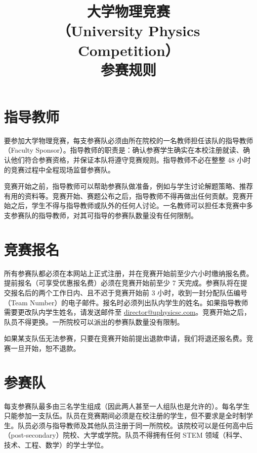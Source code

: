 \documentclass[11pt,a4paper]{ctexart}
\title{\bfseries 大学物理竞赛\\[0.3em]（University Physics Competition）\\[0.3em]参赛规则}
\author{}
\date{}
\begin{document}
\maketitle

\vspace{-2em}


\vspace{1em}

\section{指导教师}

要参加大学物理竞赛，每支参赛队必须由所在院校的一名教师担任该队的指导教师（Faculty
Sponsor）。指导教师的职责是：确认参赛学生确实在本校注册就读、确认他们符合参赛资格，并保证本队将遵守竞赛规则。指导教师不必在整整 48 小时的竞赛过程中全程现场监督参赛队。

竞赛开始之前，指导教师可以帮助参赛队做准备，例如与学生讨论解题策略、推荐有用的资料等。竞赛开始、赛题公布之后，指导教师不得再做出任何贡献。竞赛开始之后，学生不得与指导教师或队外的任何人讨论。一名教师可以担任本竞赛中多支参赛队的指导教师，对其可指导的参赛队数量没有任何限制。

\section{竞赛报名}

所有参赛队都必须在本网站上正式注册，并在竞赛开始前至少六小时缴纳报名费。提前报名（可享受优惠报名费）必须在竞赛开始前至少 7 天完成。参赛队将在提交报名后的两个工作日内、且不迟于竞赛开始前 3 小时，收到一封分配队伍编号（Team
Number）的电子邮件。报名时必须列出队内学生的姓名。如果指导教师需要更改队内学生姓名，请发送邮件至
\href{mailto:director@uphysicsc.com}{\mbox{director@uphysicsc.com}}。竞赛开始之后，队员不得更换。一所院校可以派出的参赛队数量没有限制。

如果某支队伍无法参赛，只要在竞赛开始前提出退款申请，我们将退还报名费。竞赛一旦开始，恕不退款。

\section{参赛队}

每支参赛队最多由三名学生组成（因此两人甚至一人组队也是允许的）。每名学生只能参加一支队伍。队员在竞赛期间必须是在校注册的学生，但不要求是全时制学生。队员必须与指导教师及其他队员注册于同一所院校。该院校可以是任何高中后（post-secondary）院校、大学或学院。队员不得拥有任何 STEM 领域（科学、技术、工程、数学）的学士学位。
\end{document}
